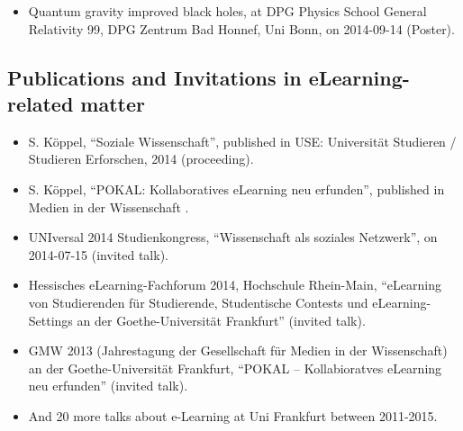 \begin{fullwidth}
\begin{multicols}{2}
\begin{itemize}
	\item Quantum gravity improved black holes, at DPG Physics School General 
	Relativity 99, DPG Zentrum Bad Honnef, Uni Bonn, on 2014-09-14 (Poster).
\end{itemize}

\subsection*{Publications and Invitations in eLearning-related matter}
\begin{itemize}
	\item
	S. Köppel,
	``Soziale Wissenschaft'',
	published in USE: Universität Studieren / Studieren Erforschen, 2014
	(proceeding).
	
	\item
	S. Köppel,
	``POKAL: Kollaboratives eLearning neu erfunden'',
	published in Medien in der Wissenschaft \cite{Koeppel2013}.
	
	\item UNIversal 2014 Studienkongress, ``Wissenschaft als soziales Netzwerk'',
	  on 2014-07-15 (invited talk).
	
	\item Hessisches eLearning-Fachforum 2014, Hochschule Rhein-Main,
	``eLearning von Studierenden für Studierende,
	Studentische Contests und eLearning-Settings an der Goethe-Universität 
	Frankfurt'' (invited talk).
	
	\item GMW 2013
	(Jahrestagung der Gesellschaft für Medien in der
	Wissenschaft) an der
	Goethe-Universität Frankfurt,
	``POKAL – Kollabioratves eLearning neu erfunden''
	(invited talk).

    \item And 20 more talks about e-Learning at Uni Frankfurt between 2011-2015.
	
\end{itemize}


\end{multicols}
\end{fullwidth}
